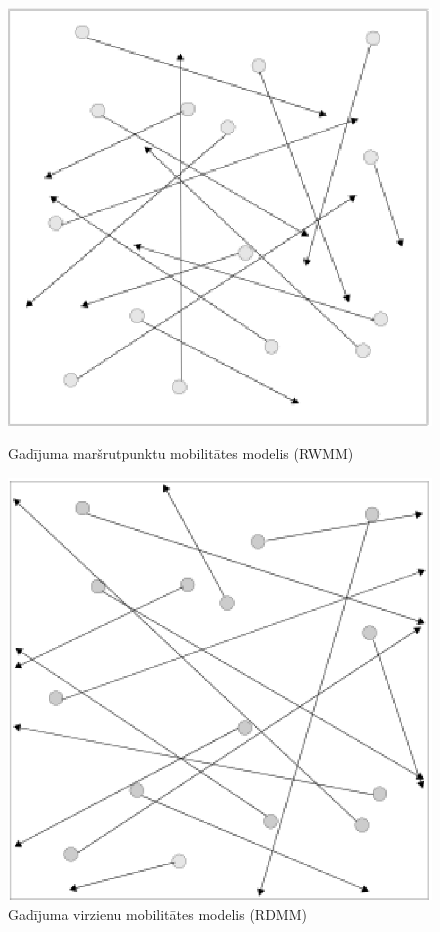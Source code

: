 \begin{figure}[htb!]
\begin{minipage}[t]{0.45\linewidth}
\centering
\includegraphics[scale=0.45]{./graph/RWMM1}
\caption{Gadījuma maršrutpunktu mobilitātes modelis (RWMM)} \label{fig:rwmm}
\end{minipage}%
\hspace{0.5in}
\begin{minipage}[t]{0.45\linewidth}
\centering
\includegraphics[scale=0.45]{./graph/RWMM2}
\caption{Gadījuma virzienu mobilitātes modelis (RDMM)} \label{fig:rdmm}
\end{minipage}
\end{figure}

